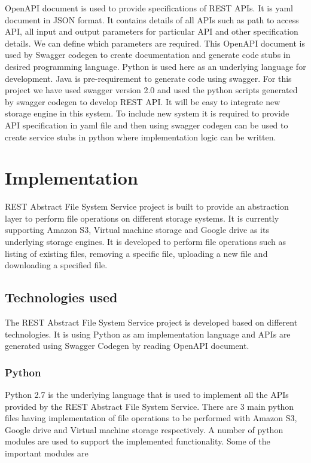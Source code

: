 OpenAPI document is used to provide specifications of REST APIs.
It is yaml document in JSON format. 
It contains details of all APIs such as path 
to access API, all input and output parameters for particular API 
and other specification details. We can define which parameters are 
required.
This OpenAPI document is used by Swagger codegen to create documentation 
and generate code stubs in desired programming language. 
Python is used here as an underlying language for development.
Java is pre-requirement to generate code using swagger. For this 
project we have used swagger version 2.0 and used the python scripts 
generated by swagger codegen to develop REST API.
It will be easy to integrate new storage engine in this system. To include 
new system it is required to provide API specification in yaml file and 
then using swagger codegen can be used to create service stubs in python 
where implementation logic can be written. 


\section{Implementation}
REST Abstract File System Service project is built to provide 
an abstraction layer to perform file operations on different 
storage systems. It is currently supporting Amazon S3, 
Virtual machine storage and Google drive as its underlying 
storage engines.
It is developed to perform file operations such as listing of 
existing files, removing a specific file, uploading a new file 
and downloading a specified file.

\subsection{Technologies used}

The REST Abstract File System Service project is developed based on
different technologies. It is using Python as am implementation
language and APIs are generated using Swagger Codegen by reading
OpenAPI document.

\subsubsection{Python}

Python 2.7 is the underlying language that is used to implement all
the APIs provided by the REST Abstract File System Service.  There are
3 main python files having implementation of file operations to be
performed with Amazon S3, Google drive and Virtual machine storage
respectively. A number of python modules are used to support the
implemented functionality. Some of the important modules are

